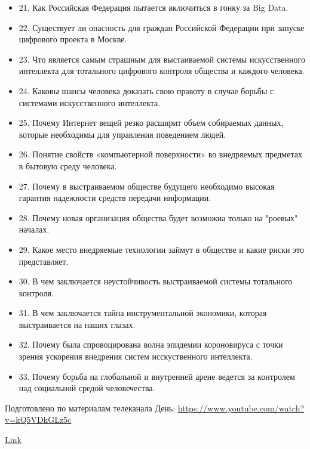 \documentclass[a4paper,11pt]{extreport}
\begin{document}
\begin{itemize}
\item 21. Как Российская Федерация пытается включиться в гонку за Big Data.
\item 22. Существует ли опасность для граждан Российской Федерации при запуске цифрового проекта в Москве.
\item 23. Что является самым страшным для выстаиваемой системы искусственного интеллекта для тотального цифрового контроля общества и каждого человека.
\item 24. Каковы шансы человека доказать свою правоту в случае борьбы с системами искусственного интеллекта.
\item 25. Почему Интернет вещей резко расширит объем собираемых данных, которые необходимы для управления поведением людей.
\item 26. Понятие свойств «компьютерной поверхности» во внедряемых предметах в бытовую среду человека.
\item 27. Почему в выстраиваемом обществе будущего необходимо высокая гарантия надежности средств передачи информации.
\item 28. Почему новая организация общества будет возможна только на "роевых" началах.
\item 29. Какое место внедряемые технологии займут в обществе и какие риски это представляет.
\item 30. В чем заключается неустойчивость выстраиваемой системы тотального контроля.
\item 31. В чем заключается тайна инструментальной экономики, которая выстраивается на наших глазах.
\item 32. Почему была спровоцирована волна эпидемии короновируса с точки зрения ускорения внедрения систем исскуственного интеллекта.
\item 33. Почему борьба на глобальной и внутренней арене ведется за контролем над социальной средой человечества.
\end{itemize}

Подготовлено по материалам телеканала День: \url{https://www.youtube.com/watch?v=kQ5VDkGLz5c}

\href{https://l.facebook.com/l.php?u=https%3A%2F%2Fgeopolitikym.site%2Fot-bilderberga-k-gulagbergu-kak-globalnaya-elita-stroit-elektronnyj-konclager%2F%3Ffbclid%3DIwAR2STwnETlzpyNSDpL7P24IUX3S9WvWJB3Ab1Nc0EsgWvOaiteQc_z4j17c&h=AT1wbjkDVgFxalonLp4tcLk7UcepD4MGhTKyYPTvOLOHSSxiwOokqhs5BrD4Ej6pVt2BnHWiM3IqQA22Bk3bwqIrzI6AwQAWqvau4pGchOJOw6ZvAhA9uLCBIwR61e830dNk3u4f0eC4H1DireSmfYmKig5BljlSpF9wkJgEMhSilbUeVsMKi9WZOOY_KP2KCR9O4X0OLwwnDTcSZXvaq0V-fM3d7k4w4oWEt_MyMW7-IDbmYgecAuf6AEwoImloPpur2S6Kt0Lw_aP9u684QDEK14JAffEYHjL4hl5Th9n_QT-Hx7cVZ6Psm7jTV0q_UI9zuPfmjAg8Z-HFM3nW83cj7A1wyBs5sdDQti1XKVmgM-lvKUx38sj0FCMEFZhJsOEFvoGWmxUYERpTRG_Eb1ykfsTo4aQ-ToXtYXRJYJOth8h_K3f5balQdFRXyTQWP7gqDr1FbJ9w8PxDRgcvjWZn_aV8n6sR05RordJB4GjgJ_mDl6nzpbP8OjCLkHzFBJVnqPaCIswsvR7_DxYwU61bjGU0eGr8hw9H_ogPD_ztb4I_TGGfo77G_OGHku3TUAu2CTkxw-4IbN00iv9sM6jRE_SuBWTviUIfDDtKCyNX1qJF792st5kk5YLmdCmbgBzT0dgi0i3p5L0}{Link} 
\end{document}
